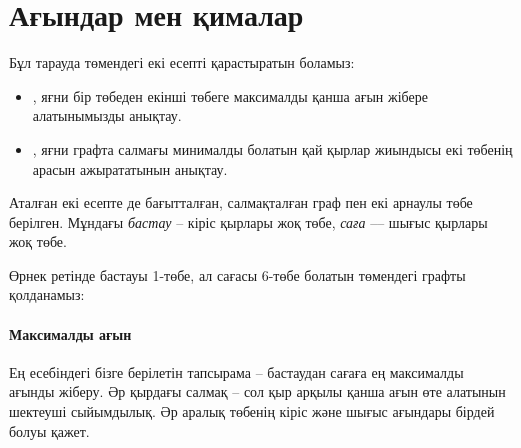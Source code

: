 \chapter{Ағындар мен қималар}

Бұл тарауда төмендегі екі есепті 
қарастыратын боламыз:

\begin{itemize}
\item {}, яғни 
бір төбеден екінші төбеге максималды қанша 
ағын жібере алатынымызды анықтау.
\item {}, яғни
графта салмағы минималды болатын
қай қырлар жиындысы 
екі төбенің арасын ажырататынын анықтау.
\end{itemize}

Аталған екі есепте де бағытталған,
салмақталған граф пен
екі арнаулы төбе берілген. Мұндағы
\emph{бастау} -- кіріс қырлары жоқ төбе,
\emph{саға} –– шығыс қырлары жоқ төбе.

Өрнек ретінде бастауы 1-төбе,
ал сағасы 6-төбе болатын төмендегі графты қолданамыз:

\begin{center}
\end{center}

\subsubsection{Максималды ағын}


Ең  есебіндегі
бізге берілетін тапсырама -- бастаудан сағаға
ең максималды ағынды жіберу. Әр қырдағы салмақ --
сол қыр арқылы қанша ағын өте алатынын шектеуші
сыйымдылық. Әр аралық төбенің кіріс және шығыс
ағындары бірдей болуы қажет. 

